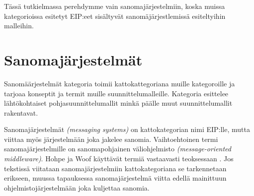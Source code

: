 Tässä tutkielmassa perehdymme vain sanomajärjestelmiin, koska muissa kategorioissa esitetyt EIP:eet sisältyvät sanomäjärjestlemissä esiteltyihin malleihin.

\section{Sanomajärjestelmät}
Sanomäärjestelmät kategoria toimii kattokattegoriana muille kategoroille ja tarjoaa konseptit ja termit muille suunnittelumalleille. 
Kategoria esittelee lähtökohtaiset pohjasuunnittelumallit minkä päälle muut suunnittelumallit rakentavat. 

Sanomajärjestelmät \textit{(messaging systems)} on kattokategorian nimi EIP:lle, mutta viittaa myös järjestelmään joka jakelee sanomia. Vaihtoehtoinen termi sanomajärjestelmille on sanomapohjainen väliohjelmisto \textit{(message-oriented middleware)}. Hohpe ja Woof käyttävät termiä vastaavasti teoksessaan \citep{Hohpe2004}. Jos tekstissä viitataan sanomajärjestelmiin kattokategoriana se tarkennetaan erikseen, muussa tapauksessa sanomajärjestelmä viitta edellä mainittuun ohjelmistojärjestelmään joka kuljettaa sanomia.

